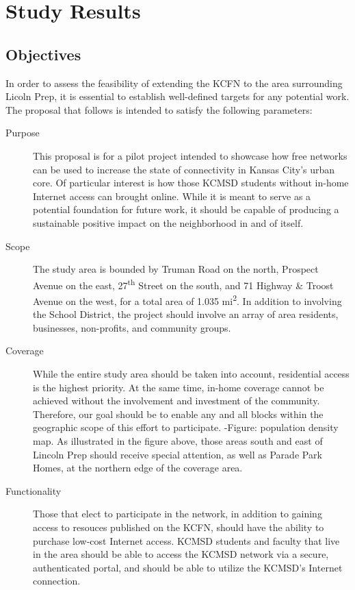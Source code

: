 \section{Study Results}\label{LPA}

\subsection{Objectives}
In order to assess the feasibility of extending the KCFN to the area surrounding
Licoln Prep, it is essential to establish well-defined targets for any potential
work. The proposal that follows is intended to satisfy the following parameters:

\begin{description}
\item[Purpose] This proposal is for a pilot project intended to showcase how
free networks can be used to increase the state of connectivity in Kansas City's
urban core. Of particular interest is how those KCMSD students without in-home
Internet access can brought online. While it is meant to serve as a potential foundation for future work, it
should be capable of producing a sustainable positive impact on the
neighborhood in and of itself.

\item[Scope] The study area is bounded by Truman Road on the north, Prospect
Avenue on the east, 27\textsuperscript{th} Street on the south, and 71 Highway \& Troost
Avenue on the west, for a total area of 1.035 mi\textsuperscript{2}. In addition to involving
the School District, the project should involve an array of area residents,
businesses, non-profits, and community groups. 

\item[Coverage] While the entire study area should be taken into account,
residential access is the highest priority. At the same time, in-home coverage
cannot be achieved without the involvement and investment of the community.
Therefore, our goal should be to enable any and all blocks within
the geographic scope of this effort to participate.
-Figure: population density map.
As illustrated in the figure above, those areas south and east of Lincoln Prep
should receive special attention, as well as Parade Park Homes, at the northern
edge of the coverage area.

\item[Functionality] Those that elect to participate in the network, in addition
to gaining access to resouces published on the KCFN, should have the
ability to purchase low-cost Internet access. KCMSD students and faculty that live in
the area should be able to access the KCMSD network via a secure, authenticated portal,
and should be able to utilize the KCMSD's Internet connection.


\end{description}
